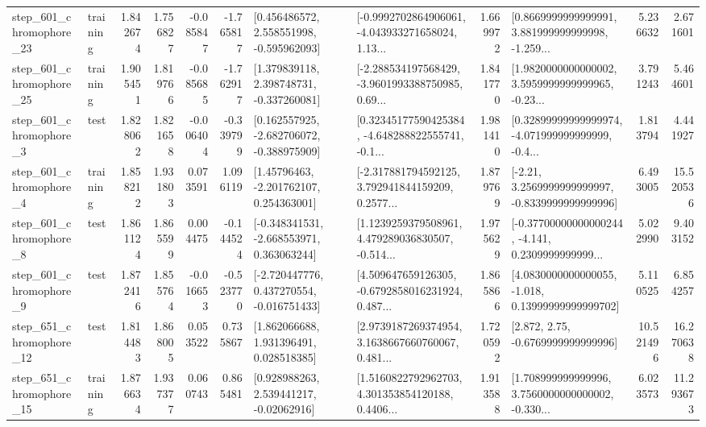 \begin{tabular}{llrrrrllrlrr}
  step\_601\_chromophore\_23 &  training &      1.842674 &    1.756827 &     -0.085847 & -1.765817 &    [0.456486572, 2.558551998, -0.595962093] &  [-0.9992702864906061, -4.043933271658024, 1.13... &       1.669972 &  [0.8669999999999991, 3.881999999999998, -1.259... &            5.236632 &          2.671601 \\
  step\_601\_chromophore\_25 &  training &      1.905451 &    1.819766 &     -0.085685 & -1.762917 &    [1.379839118, 2.398748731, -0.337260081] &  [-2.288534197568429, -3.9601993388750985, 0.69... &       1.841770 &  [1.9820000000000002, 3.5959999999999965, -0.23... &            3.791243 &          5.464601 \\
   step\_601\_chromophore\_3 &      test &      1.828062 &    1.821658 &     -0.006404 & -0.339799 &   [0.162557925, -2.682706072, -0.388975909] &  [0.32345177590425384, -4.648288822555741, -0.1... &       1.981410 &  [0.32899999999999974, -4.071999999999999, -0.4... &            1.813794 &          4.441927 \\
   step\_601\_chromophore\_4 &  training &      1.858212 &    1.931803 &      0.073591 &  1.096119 &     [1.45796463, -2.201762107, 0.254363001] &  [-2.317881794592125, 3.792941844159209, 0.2577... &       1.879769 &   [-2.21, 3.2569999999999997, -0.8339999999999996] &            6.493005 &         15.520536 \\
   step\_601\_chromophore\_8 &      test &      1.861124 &    1.865599 &      0.004475 & -0.144524 &   [-0.348341531, -2.668553971, 0.363063244] &  [1.1239259379508961, 4.479289036830507, -0.514... &       1.975629 &  [-0.37700000000000244, -4.141, 0.2309999999999... &            5.022990 &          9.403152 \\
   step\_601\_chromophore\_9 &      test &      1.872416 &    1.855764 &     -0.016653 & -0.523770 &   [-2.720447776, 0.437270554, -0.016751433] &  [4.509647659126305, -0.6792858016231924, 0.487... &       1.865866 &  [4.0830000000000055, -1.018, 0.13999999999999702] &            5.110525 &          6.854257 \\
  step\_651\_chromophore\_12 &      test &      1.814483 &    1.868005 &      0.053522 &  0.735867 &     [1.862066688, 1.931396491, 0.028518385] &  [2.9739187269374954, 3.1638667660760067, 0.481... &       1.720592 &                 [2.872, 2.75, -0.6769999999999996] &           10.521496 &         16.270638 \\
  step\_651\_chromophore\_15 &  training &      1.876634 &    1.937377 &      0.060743 &  0.865481 &     [0.928988263, 2.539441217, -0.02062916] &  [1.5160822792962703, 4.301353854120188, 0.4406... &       1.913588 &  [1.708999999999996, 3.7560000000000002, -0.330... &            6.023573 &         11.293673 \\

\end{tabular}
